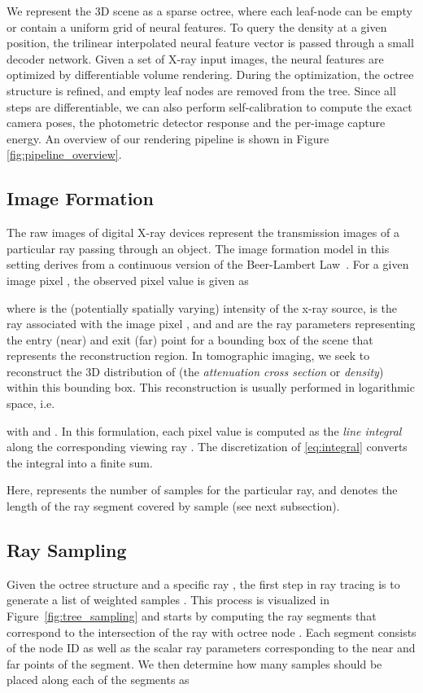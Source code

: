 \documentclass[acmtog,nonacm]{acmart} \acmSubmissionID{0438}
\begin{document}
We represent the 3D scene as a sparse octree, where each leaf-node can be empty or contain a uniform grid of neural features.
To query the density at a given position, the trilinear interpolated neural feature vector is passed through a small decoder network.
Given a set of X-ray input images, the neural features are optimized by differentiable volume rendering.
During the optimization, the octree structure is refined, and empty leaf nodes are removed from the tree.
Since all steps are differentiable, we can also perform self-calibration to compute the exact camera poses, the photometric detector response and the per-image capture energy.
An overview of our rendering pipeline is shown in Figure \ref{fig:pipeline_overview}.

\subsection{Image Formation}

The raw images of digital X-ray devices represent the transmission
images of a particular ray passing through an object.  The image
formation model in this setting derives from a continuous version of
the Beer-Lambert Law~\cite{kak2001principles}. For a given image pixel
, the observed pixel value is given as

where  is the (potentially spatially varying) intensity of
the x-ray source,  is the ray associated with the image pixel
, and  and  are the ray parameters representing the
entry (near) and exit (far) point for a bounding box of the scene that
represents the reconstruction region. In tomographic imaging, we seek
to reconstruct the 3D distribution of  (the {\em
  attenuation cross section} or {\em density}) within this bounding
box.  This reconstruction is usually performed in logarithmic space,
i.e.

with  and . In this formulation,
each pixel value  is computed as the {\em line integral}
along the corresponding viewing ray .
The discretization of \eqref{eq:integral} converts the integral into a finite sum.

Here,  represents the number of samples for the particular ray,
and  denotes the length of the ray segment  covered by
sample  (see next subsection).

\subsection{Ray Sampling}
\label{sec:sampling}
Given the octree structure and a specific ray , the first step
in ray tracing is to generate a list of weighted samples
.  This process is
visualized in Figure~\ref{fig:tree_sampling} and starts by computing
the ray segments 
that correspond to the intersection of the ray with octree node
. Each segment consists of the node ID as well as the scalar ray
parameters  corresponding to the near and far points of
the segment. We then determine how many samples should be placed along
each of the segments as
\end{document}
